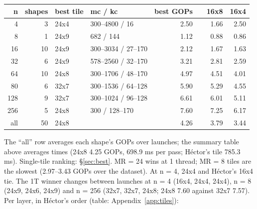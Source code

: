 \begin{center}\small
\begin{tabular}{@{}rrll rr rr@{}}
\toprule
n & shapes & best tile & mc / kc & best GOPs & & 16x8 & 16x4 \\
\midrule
4 & 3 & 24x4 & 300--4800 / 16 & 2.50 &  & 1.66 & 2.50 \\
8 & 1 & 24x9 & 682 / 144 & 1.12 &  & 0.88 & 0.86 \\
16 & 10 & 24x9 & 300--3034 / 27--170 & 2.12 &  & 1.67 & 1.63 \\
32 & 6 & 24x9 & 578--2560 / 32--170 & 3.21 &  & 2.81 & 2.59 \\
64 & 10 & 24x8 & 300--1706 / 48--170 & 4.97 &  & 4.51 & 4.01 \\
80 & 6 & 32x7 & 300--1536 / 64--128 & 5.90 &  & 5.29 & 4.55 \\
128 & 9 & 32x7 & 300--1024 / 96--128 & 6.61 &  & 6.01 & 5.11 \\
256 & 5 & 24x8 & 300 / 128--170 & 7.60 &  & 7.25 & 6.17 \\
\midrule
all & 50 & 24x8 &  & 4.26 &  & 3.79 & 3.44 \\
\bottomrule
\end{tabular}
\end{center}

\noindent The  ``all'' row averages each shape's GOPs over launches; the summary table above averages times (24x8 4.25 GOPs, 698.9 ms per pass; H\'ector's tile 785.3 ms). Single-tile ranking: \S\ref{sec:best}. MR = 24 wins at 1 thread; MR = 8 tiles are the slowest (2.97--3.43 GOPs over the dataset). At n = 4, 24x4 and H\'ector's 16x4 tie. The 1T winner changes between launches at n = 4 (16x4, 24x4, 24x4), n = 8 (24x9, 24x6, 24x9) and n = 256 (32x7, 32x7, 24x8; 24x8 7.60 against 32x7 7.57). Per layer, in H\'ector's order (table: Appendix~\ref{app:tiles}):



